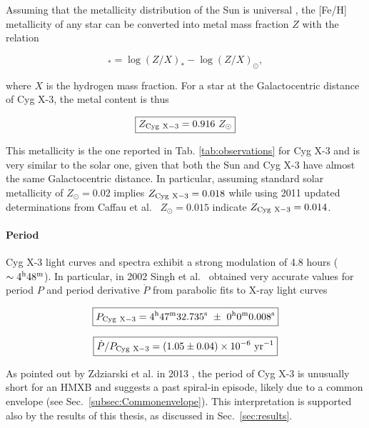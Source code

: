 \documentclass[a4paper,titlepage]{book}     	%
\newcommand{\sun}{\ensuremath{_\odot}}
\newcommand{\zsun}{\ensuremath{Z\sun}}
\newcommand{\yr}{\text{yr}}
\begin{document}
Assuming that the metallicity distribution of the Sun is universal \cite{metallicityFeHconversion}, the [Fe/H] metallicity of any star can be converted into metal mass fraction $Z$ with the relation 

\begin{equation}
    [\rm Fe/H]_* = \log(Z/X)_* - \log(Z/X)_\odot{},
\end{equation}


where $X$ is the hydrogen mass fraction. For a star at the Galactocentric distance of Cyg X-3, the metal content is thus

\begin{equation}\label{eq:CygX3metallicity}
    \boxed{Z_{\rm Cyg~X-3} = 0.916~\zsun}
\end{equation}

This metallicity is the one reported in Tab. \ref{tab:observations} for Cyg X-3 and is  very similar to the solar one, given that both the Sun and Cyg X-3 have almost the same Galactocentric distance. In particular, assuming standard solar metallicity of $\zsun =0.02$ implies $Z_{\rm Cyg~X-3} = 0.018$ while using 2011 updated determinations from Caffau et al.\ \cite{caffau2011solarmetallicity} $\zsun=0.015$ indicate $Z_{\rm Cyg~X-3}=0.014$.


\paragraph{Period} Cyg X-3 light curves and spectra exhibit a strong modulation of 4.8 hours ($\sim 4^{\rm h} 48^{\rm m}$). In particular, in 2002 Singh et al.\ \cite{CygX-3_Singh2002} obtained very accurate values for period $P$ and period derivative $\dot{P}$ from parabolic fits to X-ray light curves

\begin{equation}\label{eq:periodCygX3}
    \boxed{P_{\rm Cyg~X-3} = 4^{\rm h} 47^{\rm m} 32.735^{\rm s}~\pm~0^{\rm h} 0^{\rm m} 0.008^{\rm s}}
\end{equation}

\begin{equation}\label{eq:pdotCygX3}
    \boxed{\dot{P}/P_{\rm Cyg~X-3} = (1.05 \pm 0.04) \times 10^{-6}~\yr^{-1}}
\end{equation}

As pointed out by Zdziarski et al. in 2013 \cite{Cyg-X3_Zd2013}, the period of Cyg X-3 is unusually short for an HMXB and suggests a past spiral-in episode, likely due to a common envelope (see Sec.\ \ref{subsec:Commonenvelope}). This interpretation is supported also by the results of this thesis, as discussed in Sec.\ \ref{sec:results}.
\end{document}
